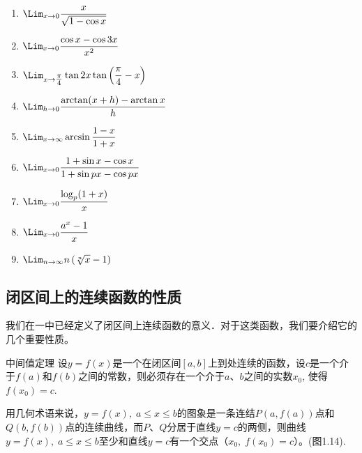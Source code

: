 \begin{ex}
\begin{enumerate}
\begin{multicols}{2}
\begin{enumerate}
\item $\Lim_{x\to 0}\frac{x}{\sqrt{1-\cos x}}$
\item $\Lim_{x\to 0}\frac{\cos x-\cos 3x}{x^2}$
\item $\Lim_{x\to \tfrac{\pi}{4}}\tan 2x\tan\left(\frac{\pi}{4}-x\right)$
\item $\Lim_{h\to 0}\frac{\arctan (x+h)-\arctan x}{h}$
\item $\Lim_{x\to \infty}\arcsin \frac{1-x}{1+x}$
\item $\Lim_{x\to 0}\frac{1+\sin x-\cos x}{1+\sin px-\cos px}$
\item $\Lim_{x\to 0}\frac{\log_p(1+x)}{x}$
\item $\Lim_{x\to 0}\frac{a^x-1}{x}$
\item $\Lim_{n\to \infty}n\left(\sqrt[n]{x}-1\right)$
    \end{enumerate}
\end{multicols}
\end{enumerate}
\end{ex}

\subsection{闭区间上的连续函数的性质}

我们在一中已经定义了闭区间上连续函数的意义．对于这类函数，我们要介绍它的几个重要性质。

\begin{blk}
    {中间值定理} 设$y=f(x)$是一个在闭区间$[a,b]$上到处连续的函数，设$c$是一个介于$f(a)$和$f(b)$之间的常数，则必须存在一个介于$a$、$b$之间的实数$x_0$, 使得$f(x_0)=c$.
\end{blk}

用几何术语来说，$y=f(x),\; a\le x\le b$的图象是一条连结$P(a,f(a))$点和$Q(b,f(b))$点的连续曲线，而$P$、$Q$分居于直线$y=c$的两侧，则曲线$y=f(x),\; a\le x\le b$至少和直线$y=c$有一个交点（$x_0,\; f(x_0)=c$）。(图1.14).
\begin{figure}[htp]
    \centering
{}
    \caption{}
\end{figure}


